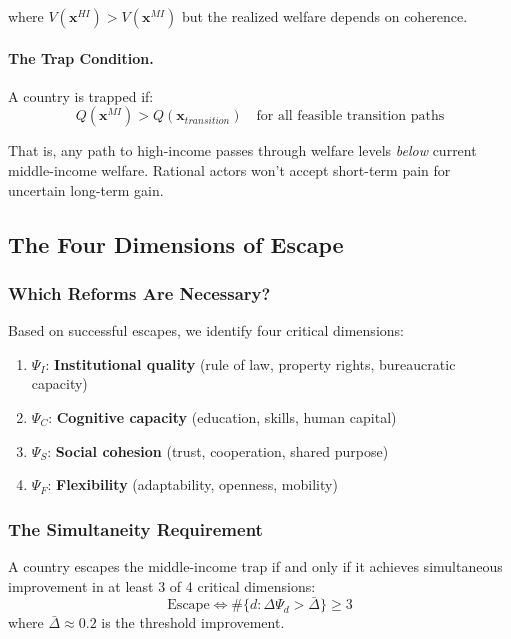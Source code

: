 where $V(\mathbf{x}^{HI}) > V(\mathbf{x}^{MI})$ but the realized welfare depends 
on coherence.

\paragraph{The Trap Condition.}
A country is trapped if:
\begin{equation}
Q(\mathbf{x}^{MI}) > Q(\mathbf{x}_{transition}) \quad \text{for all feasible transition paths}
\label{eq:trap-condition}
\end{equation}

That is, any path to high-income passes through welfare levels \emph{below} 
current middle-income welfare. Rational actors won't accept short-term pain 
for uncertain long-term gain.

\subsection{The Four Dimensions of Escape}

\subsubsection{Which Reforms Are Necessary?}

Based on successful escapes, we identify four critical dimensions:

\begin{enumerate}
    \item $\Psi_I$: \textbf{Institutional quality} (rule of law, property rights, bureaucratic capacity)
    \item $\Psi_C$: \textbf{Cognitive capacity} (education, skills, human capital)
    \item $\Psi_S$: \textbf{Social cohesion} (trust, cooperation, shared purpose)
    \item $\Psi_F$: \textbf{Flexibility} (adaptability, openness, mobility)
\end{enumerate}

\subsubsection{The Simultaneity Requirement}

\begin{theorem}
A country escapes the middle-income trap if and only if it achieves 
simultaneous improvement in at least 3 of 4 critical dimensions:
\begin{equation}
\text{Escape} \Leftrightarrow \#\{d : \Delta \Psi_d > \bar{\Delta}\} \geq 3
\label{eq:simultaneity}
\end{equation}
where $\bar{\Delta} \approx 0.2$ is the threshold improvement.
\end{theorem}

